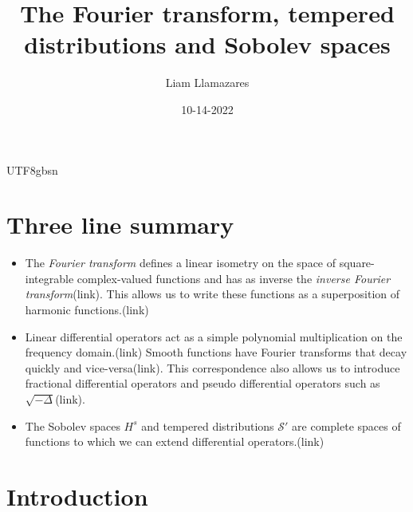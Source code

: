 \documentclass[
]{article}
\title{The Fourier transform, tempered distributions and Sobolev spaces}
\author{Liam Llamazares}
\date{10-14-2022}
\begin{document}
\maketitle

{UTF8}{gbsn}

\hypertarget{three-line-summary}{%
\section*{\texorpdfstring{ Three line summary
}{ Three line summary }}\label{three-line-summary}}

\begin{itemize}
\item
  The \emph{Fourier transform} defines a linear isometry on the space of
  square-integrable complex-valued functions and has as inverse the
  \emph{inverse Fourier transform}(link). This allows us to write these
  functions as a superposition of harmonic functions.(link)
\item
  Linear differential operators act as a simple polynomial
  multiplication on the frequency domain.(link) Smooth functions have
  Fourier transforms that decay quickly and vice-versa(link). This
  correspondence also allows us to introduce fractional differential
  operators and pseudo differential operators such as
  \(\sqrt{-\Delta }\)(link).
\item
  The Sobolev spaces \(H^s\) and tempered distributions
  \({\mathcal S}'\) are complete spaces of functions to which we can
  extend differential operators.(link)
\end{itemize}

\hypertarget{introduction}{%
\section*{Introduction}\label{introduction}}
\end{document}
